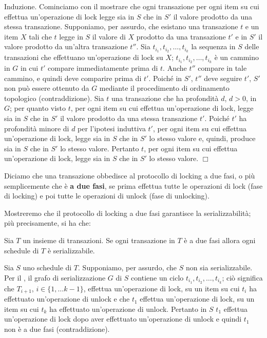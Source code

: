 Induzione. Cominciamo con il mostrare che ogni transazione per ogni item su cui effettua
un'operazione di lock legge sia in $S$ che in $S'$ il valore prodotto da una stessa transazione.
Supponiamo, per assurdo, che esistano una transazione $t$ e un item $X$ tali che $t$ legge in $S$ il valore
di $X$ prodotto da una transazione $t'$ e in $S'$ il valore prodotto da un'altra transazione $t''$. Sia $t_{i_1},
t_{i_2}, \ldots, t_{i_k}$ la sequenza in $S$ delle transazioni che effettuano un'operazione di lock su $X$; $t_{i_1},
t_{i_2}, \ldots, t_{i_k}$ è un cammino in $G$ in cui $t'$ compare immediatamente prima di $t$. Anche $t''$ compare in tale
cammino, e quindi deve comparire prima di $t'$. Poiché in $S'$, $t''$ deve seguire $t'$, $S'$ non può essere
ottenuto da $G$ mediante il procedimento di ordinamento topologico (contraddizione).
Sia $t$ una transazione che ha profondità $d$, $d>0$, in $G$; per quanto visto $t$, per ogni item su cui
effettua un'operazione di lock, legge sia in $S$ che in $S'$ il valore prodotto da una stessa transazione
$t'$. Poiché $t'$ ha profondità minore di $d$ per l'ipotesi induttiva $t'$, per ogni item su cui effettua
un'operazione di lock, legge sia in $S$ che in $S'$ lo stesso valore e, quindi, produce sia in $S$ che in $S'$ lo
stesso valore. Pertanto $t$, per ogni item su cui effettua un'operazione di lock, legge sia in $S$ che in $S'$
lo stesso valore. \hfill $\Box$\\
\begin{defn}
Diciamo che una transazione obbedisce al protocollo di locking a due fasi, o più semplicemente che
è \textbf{a due fasi}, se prima effettua tutte le operazioni di lock (fase di locking) e poi tutte le operazioni di
unlock (fase di unlocking). 
\end{defn}
Mostreremo che il protocollo di locking a due fasi garantisce la serializzabilità; più precisamente, si ha che:
\begin{theo}
Sia $T$ un insieme di transazioni. Se ogni transazione in $T$ è a due fasi allora ogni
schedule di $T$ è serializzabile. 
\end{theo}
 Sia $S$ uno schedule di $T$. Supponiamo, per assurdo, che $S$ non sia serializzabile. Per il
, il grafo di serializzazione $G$ di $S$ contiene un ciclo $t_{i_1}, t_{i_2}, \ldots,
t_{i_k}$; ciò significa che $T_{i+1}$, $i\in \{1,\ldots k-1\}$, effettua un'operazione di lock, su un item su cui $t_i$
ha effettuato un'operazione di unlock e che $t_1$ effettua un'operazione di lock, su un item su cui $t_k$ ha effettuato
un'operazione di unlock. Pertanto in $S$ $t_1$ effettua un'operazione di lock dopo aver effettuato un'operazione di unlock
e quindi $t_1$ non è a due fasi (contraddizione).\\

